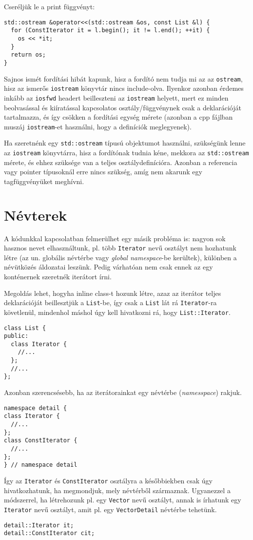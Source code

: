 \documentclass[../cpp_book/cpp_book.tex]{subfiles}
\begin{document}
	Cseréljük le a print függvényt:
	\begin{lstlisting}
std::ostream &operator<<(std::ostream &os, const List &l) {
  for (ConstIterator it = l.begin(); it != l.end(); ++it) {
    os << *it;
  }
  return os;
}
	\end{lstlisting}
	Sajnos ismét fordítási hibát kapunk, hisz a fordító nem tudja mi az az \texttt{ostream}, hisz az ismerős \texttt{iostream} könyvtár nincs include-olva. Ilyenkor azonban érdemes inkább az \texttt{iosfwd} headert beilleszteni az \texttt{iostream} helyett, mert ez minden beolvasással és kiíratással kapcsolatos osztály/függvénynek csak a deklarációját tartalmazza, és így csökken a fordítási egység mérete (azonban a cpp fájlban muszáj \texttt{iostream}-et használni, hogy a definíciók meglegyenek).
	\begin{note}
		Ha szeretnénk egy \texttt{std::ostream} típusú objektumot használni, szükségünk lenne az \texttt{iostream} könyvtárra, hisz a fordítónak tudnia kéne, mekkora az \texttt{std::ostream} mérete, és ehhez szüksége van a teljes osztálydefinícióra. Azonban a referencia vagy pointer típusoknál erre nincs szükség, amíg nem akarunk egy tagfüggvényüket meghívni.
	\end{note}
	\section{Névterek}
	A kódunkkal kapcsolatban felmerülhet egy másik probléma is: nagyon sok hasznos nevet elhasználtunk, pl. több \texttt{Iterator} nevű osztályt nem hozhatunk létre (az un. globális névtérbe vagy \textit{global namespace}-be kerültek), különben a névütközés áldozatai leszünk. Pedig várhatóan nem csak ennek az egy konténernek szeretnék iterátort írni.
	\smallskip
	
	Megoldás lehet, hogyha inline class-t hozunk létre, azaz az iterátor teljes deklarációját beillesztjük a \texttt{List}-be, így csak a \texttt{List} lát rá \texttt{Iterator}-ra követlenül, mindenhol máshol úgy kell hivatkozni rá, hogy \texttt{List::Iterator}.
	\begin{lstlisting}
class List {
public:
  class Iterator {
    //...
  };
  //...
};
	\end{lstlisting}
	
	Azonban szerencsésebb, ha az iterátorainkat egy névtérbe (\textit{namesspace}) rakjuk.
\begin{lstlisting}
namespace detail {
class Iterator {
  //...
};
class ConstIterator {
  //...
};
} // namespace detail
\end{lstlisting}
	Így az \texttt{Iterator} és \texttt{ConstIterator} osztályra a későbbiekben csak úgy hivatkozhatunk, ha megmondjuk, mely névtérből származnak. Ugyanezzel a módszerrel, ha létrehozunk pl. egy \texttt{Vector} nevű osztályt, annak is írhatunk egy \texttt{Iterator} nevű osztályt, amit pl. egy \texttt{VectorDetail} névtérbe tehetünk.
	\begin{lstlisting}
detail::Iterator it;
detail::ConstIterator cit;
	\end{lstlisting}
\end{document}
